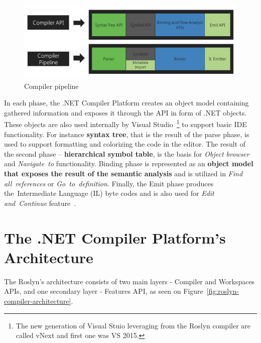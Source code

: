 \documentclass[
  digital, %
  table,   %
  lof,     %
  lot,     %
  oneside,
]{fithesis3}
\begin{document}
\begin{figure}[h!]
		\centering
			\includegraphics[scale=0.5]{img/roslyn-compiler-pipeline}
		\caption{Compiler pipeline~\cite{roslyn-overview}}
		\label{fig:roslyn-compiler-pipeline}
\end{figure}

In each phase, the .NET Compiler Platform creates an object model containing gathered information and exposes it through the API in form of .NET objects. These objects are also used internally by Visual Studio~\footnote{The new generation of Visual Stuio leveraging from the Roslyn compiler are called vNext and first one was VS 2015.} to support basic IDE functionality. For instance \textbf{syntax tree}, that is the result of the parse phase, is used to support formatting and colorizing the code in the editor. The result of the second phase -- \textbf{hierarchical symbol table}, is the basis for \textit{Object browser} and \textit{Navigate~to} functionality. Binding phase is represented as an \textbf{object model that exposes the result of the semantic analysis} and is utilized in \textit{Find all~references} or \textit{Go~to~definition}. Finally, the Emit phase produces the~Intermediate Language (IL) byte codes and is also used for \textit{Edit and~Continue} feature~\cite{roslyn-overview}.

\section{The .NET Compiler Platform's Architecture}
The Roslyn's architecture consists of two main layers - Compiler and Workspaces APIs, and one secondary layer - Features API, as seen on Figure~\ref{fig:roslyn-compiler-architecture}.
\end{document}
